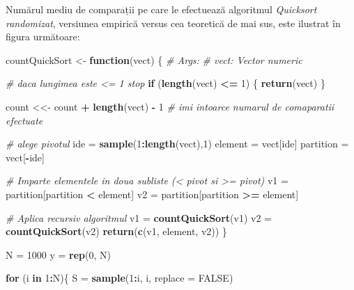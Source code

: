 \documentclass[]{article}
\newenvironment{Shaded}{\begin{snugshade}}{\end{snugshade}}
\newcommand{\CommentTok}[1]{\textcolor[rgb]{0.56,0.35,0.01}{\textit{#1}}}
\newcommand{\ControlFlowTok}[1]{\textcolor[rgb]{0.13,0.29,0.53}{\textbf{#1}}}
\newcommand{\DataTypeTok}[1]{\textcolor[rgb]{0.13,0.29,0.53}{#1}}
\newcommand{\DecValTok}[1]{\textcolor[rgb]{0.00,0.00,0.81}{#1}}
\newcommand{\KeywordTok}[1]{\textcolor[rgb]{0.13,0.29,0.53}{\textbf{#1}}}
\newcommand{\NormalTok}[1]{#1}
\newcommand{\OperatorTok}[1]{\textcolor[rgb]{0.81,0.36,0.00}{\textbf{#1}}}
\newcommand{\OtherTok}[1]{\textcolor[rgb]{0.56,0.35,0.01}{#1}}
\newcommand{\StringTok}[1]{\textcolor[rgb]{0.31,0.60,0.02}{#1}}
\begin{document}
Numărul mediu de comparații pe care le efectuează algoritmul
\emph{Quicksort randomizat}, versiunea empirică versus cea teoretică de
mai sus, este ilustrat în figura următoare:

\begin{Shaded}
\begin{Highlighting}[]
\NormalTok{countQuickSort <-}\StringTok{ }\ControlFlowTok{function}\NormalTok{(vect) \{}
  \CommentTok{# Args:}
  \CommentTok{#  vect: Vector numeric}
  
  \CommentTok{# daca lungimea este <= 1 stop}
  \ControlFlowTok{if}\NormalTok{ (}\KeywordTok{length}\NormalTok{(vect) }\OperatorTok{<=}\StringTok{ }\DecValTok{1}\NormalTok{) \{}
    \KeywordTok{return}\NormalTok{(vect)}
\NormalTok{  \}}
  
\NormalTok{  count <<-}\StringTok{ }\NormalTok{count }\OperatorTok{+}\StringTok{ }\KeywordTok{length}\NormalTok{(vect) }\OperatorTok{-}\StringTok{ }\DecValTok{1} \CommentTok{# imi intoarce numarul de comaparatii efectuate}
  
  \CommentTok{# alege pivotul}
\NormalTok{  ide =}\StringTok{ }\KeywordTok{sample}\NormalTok{(}\DecValTok{1}\OperatorTok{:}\KeywordTok{length}\NormalTok{(vect),}\DecValTok{1}\NormalTok{)}
\NormalTok{  element =}\StringTok{ }\NormalTok{vect[ide]}
\NormalTok{  partition =}\StringTok{ }\NormalTok{vect[}\OperatorTok{-}\NormalTok{ide]}
  
  \CommentTok{# Imparte elementele in doua subliste (< pivot si >= pivot)}
\NormalTok{  v1 =}\StringTok{ }\NormalTok{partition[partition }\OperatorTok{<}\StringTok{ }\NormalTok{element]}
\NormalTok{  v2 =}\StringTok{ }\NormalTok{partition[partition }\OperatorTok{>=}\StringTok{ }\NormalTok{element]}
  
  \CommentTok{# Aplica recursiv algoritmul}
\NormalTok{  v1 =}\StringTok{ }\KeywordTok{countQuickSort}\NormalTok{(v1)}
\NormalTok{  v2 =}\StringTok{ }\KeywordTok{countQuickSort}\NormalTok{(v2)}
  \KeywordTok{return}\NormalTok{(}\KeywordTok{c}\NormalTok{(v1, element, v2))}
\NormalTok{\}}

\NormalTok{N =}\StringTok{ }\DecValTok{1000}
\NormalTok{y =}\StringTok{ }\KeywordTok{rep}\NormalTok{(}\DecValTok{0}\NormalTok{, N)}

\ControlFlowTok{for}\NormalTok{ (i }\ControlFlowTok{in} \DecValTok{1}\OperatorTok{:}\NormalTok{N)\{}
\NormalTok{  S =}\StringTok{ }\KeywordTok{sample}\NormalTok{(}\DecValTok{1}\OperatorTok{:}\NormalTok{i, i, }\DataTypeTok{replace =} \OtherTok{FALSE}\NormalTok{)}
  

\end{Highlighting}
\end{Shaded}
\end{document}
